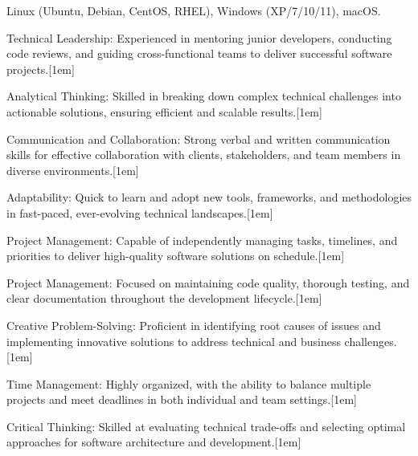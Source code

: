 \begin{cvparagraph}
  Linux (Ubuntu, Debian, CentOS, RHEL),
  Windows (XP/7/10/11),
  macOS.
\end{cvparagraph}


\begin{cvskills}

  \cvskill
  {Technical Leadership:}
  {Experienced in mentoring junior developers,
  conducting code reviews, and guiding cross-functional
  teams to deliver successful software projects.}[1em]

  \cvskill
  {Analytical Thinking:}
  {Skilled in breaking down complex technical
   challenges into actionable solutions,
   ensuring efficient and scalable results.}[1em]

  \cvskill
   {Communication and Collaboration:}
   {Strong verbal and written communication skills
    for effective collaboration with clients,
    stakeholders, and team members in
    diverse environments.}[1em]

  \cvskill
   {Adaptability:}
   {Quick to learn and adopt new tools,
   frameworks, and methodologies in fast-paced,
   ever-evolving technical landscapes.}[1em]

  \cvskill
   {Project Management:}
   {Capable of independently managing tasks,
    timelines, and priorities to deliver high-quality
    software solutions on schedule.}[1em]

  \cvskill
   {Project Management:}
   {Focused on maintaining code quality,
    thorough testing, and clear documentation
    throughout the development lifecycle.}[1em]

  \cvskill
   {Creative Problem-Solving:}
   {Proficient in identifying root causes of
    issues and implementing innovative solutions
    to address technical and business challenges.}[1em]

  \cvskill
   {Time Management:}
   {Highly organized, with the ability to balance
    multiple projects and meet deadlines in both
    individual and team settings.}[1em]

  \cvskill
   {Critical Thinking:}
   {Skilled at evaluating technical trade-offs and
    selecting optimal approaches for software
    architecture and development.}[1em]

\end{cvskills}


